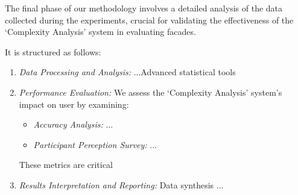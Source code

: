 The final phase of our methodology involves a detailed analysis of the data collected during the experiments, crucial for validating the effectiveness of the `Complexity Analysis' system in evaluating facades.

It is structured as follows:

\begin{enumerate}
    \item \textit{Data Processing and Analysis:} ...Advanced statistical tools
    \item \textit{Performance Evaluation:} We assess the `Complexity Analysis' system's impact on user by examining:
        \begin{itemize}
            \item \textit{Accuracy Analysis:} ...
            \item \textit{Participant Perception Survey:} ...
        \end{itemize}

        These metrics are critical

    \item \textit{Results Interpretation and Reporting:} Data synthesis ...
\end{enumerate}


%